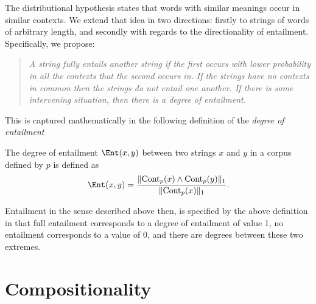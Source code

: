 The distributional hypothesis states that words with similar meanings occur in similar contexts. We extend that idea in two directions: firstly to strings of words of arbitrary length, and secondly with regards to the directionality of entailment. Specifically, we propose:
\begin{quote}
\emph{A string fully entails another string if the first occurs with lower probability in all the contexts that the second occurs in. If the strings have no contexts in common then the strings do not entail one another. If there is some intervening situation, then there is a \emph{degree} of entailment.}
\end{quote}
This is captured mathematically in the following definition of the \emph{degree of entailment}
\begin{defn}
The degree of entailment $\Ent(x,y)$ between two strings $x$ and $y$ in a corpus defined by $p$ is defined as
$$\Ent(x,y) = \frac{\|\Cont_p(x)\land\Cont_p(y)\|_1}{\|\Cont_p(x)\|_1}.$$
\end{defn}
Entailment in the sense described above then, is specified by the above definition in that full entailment corresponds to a degree of entailment of value 1, no entailment corresponds to a value of 0, and there are degrees between these two extremes.

\section{Compositionality}


% 